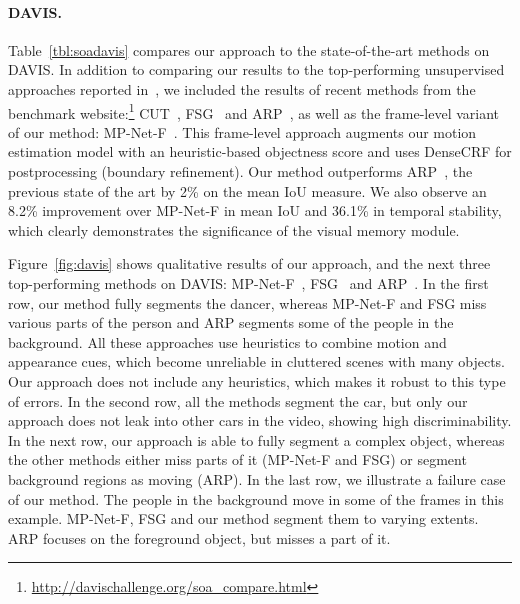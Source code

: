 \paragraph{\bf DAVIS.}
Table~\ref{tbl:soadavis} compares our approach to the state-of-the-art methods
on DAVIS. In addition to comparing our results to the top-performing
unsupervised approaches reported in~\cite{Perazzi16}, we included the results
of recent methods from the benchmark
website:\footnote{\url{http://davischallenge.org/soa_compare.html}}
CUT~\cite{keuper2015motion}, FSG~\cite{jain2017fusionseg} and
ARP~\cite{kohprimary}, as well as the frame-level variant of our method:
MP-Net-F~\cite{tokmakov2016learning}. This frame-level
  approach augments our motion estimation model with an
  heuristic-based objectness score and uses DenseCRF for
  postprocessing (boundary refinement). Our method outperforms
ARP~\cite{kohprimary}, the previous state of the art by 2\% on the mean IoU
measure. We also observe an 8.2\% improvement over MP-Net-F in mean IoU and
36.1\% in temporal stability, which clearly demonstrates the significance of
the visual memory module.

Figure~\ref{fig:davis} shows qualitative results of our approach, and the next
three top-performing methods on DAVIS: MP-Net-F~\cite{tokmakov2016learning},
FSG~\cite{jain2017fusionseg} and ARP~\cite{kohprimary}. In the first row, our
method fully segments the dancer, whereas MP-Net-F and FSG miss various
parts of the person and ARP segments some of the people in the background. All these
approaches use heuristics to combine motion and appearance cues, which become
unreliable in cluttered scenes with many objects. Our approach does not include
any heuristics, which makes it robust to this type of errors. In the second
row, all the methods segment the car, but only our approach does not leak into
other cars in the video, showing high discriminability. In the next row, our
approach is able to fully segment a complex object, whereas the other methods
either miss parts of it (MP-Net-F and FSG) or segment background regions as
moving (ARP). In the last row, we illustrate a failure case of our method. The
people in the background move in some of the frames in this example. MP-Net-F,
FSG and our method segment them to varying extents. ARP focuses on the
foreground object, but misses a part of it.

